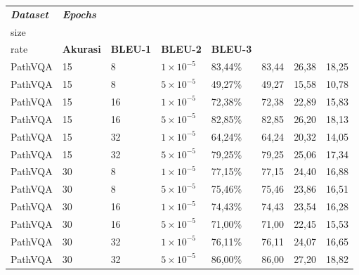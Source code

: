 
\begin{longtable}[c]{|l|l|l|l|l|l|l|l|}
    \hline
    \textit{\textbf{Dataset}} &
      \textit{\textbf{Epochs}} &
      \textit{\textbf{\begin{tabular}[c]{@{}l@{}}Batch \\ size\end{tabular}}} &
      \textit{\textbf{\begin{tabular}[c]{@{}l@{}}Learning \\ rate\end{tabular}}} &
      \textbf{Akurasi} &
      \textbf{BLEU-1} &
      \textbf{BLEU-2} &
      \textbf{BLEU-3} \\ \hline
    \endfirsthead
    \endhead
    PathVQA & 15 & 8  & $1 \times 10^{-5}$ & 83,44\% & 83,44 & 26,38 & 18,25 \\ \hline
    PathVQA & 15 & 8  & $5 \times 10^{-5}$ & 49,27\% & 49,27 & 15,58 & 10,78 \\ \hline
    PathVQA & 15 & 16 & $1 \times 10^{-5}$ & 72,38\% & 72,38 & 22,89 & 15,83 \\ \hline
    PathVQA & 15 & 16 & $5 \times 10^{-5}$ & 82,85\% & 82,85 & 26,20 & 18,13 \\ \hline
    PathVQA & 15 & 32 & $1 \times 10^{-5}$ & 64,24\% & 64,24 & 20,32 & 14,05 \\ \hline
    PathVQA & 15 & 32 & $5 \times 10^{-5}$ & 79,25\% & 79,25 & 25,06 & 17,34 \\ \hline
    PathVQA & 30 & 8  & $1 \times 10^{-5}$ & 77,15\% & 77,15 & 24,40 & 16,88 \\ \hline
    PathVQA & 30 & 8  & $5 \times 10^{-5}$ & 75,46\% & 75,46 & 23,86 & 16,51 \\ \hline
    PathVQA & 30 & 16 & $1 \times 10^{-5}$ & 74,43\% & 74,43 & 23,54 & 16,28 \\ \hline
    PathVQA & 30 & 16 & $5 \times 10^{-5}$ & 71,00\% & 71,00 & 22,45 & 15,53 \\ \hline
    PathVQA & 30 & 32 & $1 \times 10^{-5}$ & 76,11\% & 76,11 & 24,07 & 16,65 \\ \hline
    PathVQA & 30 & 32 & $5 \times 10^{-5}$ & 86,00\% & 86,00 & 27,20 & 18,82 \\ \hline

\end{longtable}
